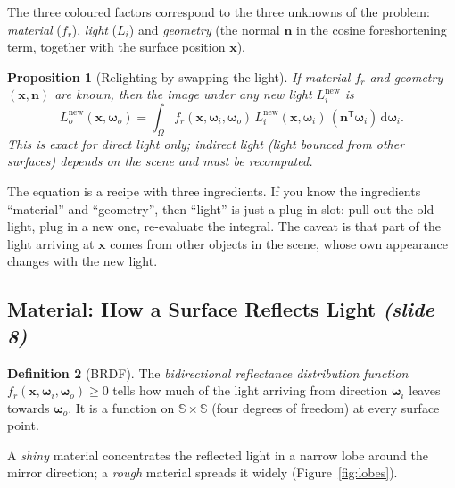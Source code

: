 \documentclass[11pt,a4paper]{article}
\newcommand{\slideone}[1]{\texorpdfstring{\emph{(slide #1)}}{(slide #1)}}
\newcommand{\Sph}{\mathbb{S}}
\newcommand{\x}{{\bm{x}}}
\newcommand{\wi}{{\bm{\omega}_i}}
\newcommand{\wo}{{\bm{\omega}_o}}
\newcommand{\n}{{\bm{n}}}
\newcommand{\fr}{f_r}
\newcommand{\Lo}{L_o}
\newcommand{\Li}{L_i}
\theoremstyle{definition}
\newtheorem{definition}{Definition}[section]
\theoremstyle{plain}
\newtheorem{proposition}[definition]{Proposition}
\theoremstyle{remark}
\begin{document}
The three coloured factors correspond to the three unknowns of the problem: \emph{material} ($\fr$), \emph{light} ($\Li$) and \emph{geometry} (the normal $\n$ in the cosine foreshortening term, together with the surface position $\x$).

\begin{proposition}[Relighting by swapping the light]\label{prop:swap}
If material $\fr$ and geometry $(\x,\n)$ are known, then the image under any new light $\Li^{\mathrm{new}}$ is
\[
 \Lo^{\mathrm{new}}(\x,\wo)=\int_{\Omega}\fr(\x,\wi,\wo)\,\Li^{\mathrm{new}}(\x,\wi)\,(\n^{\mathsf T}\wi)\,\mathrm d\wi .
\]
This is exact for \emph{direct} light only; indirect light (light bounced from other surfaces) depends on the scene and must be recomputed.
\end{proposition}

\begin{intuition}
The equation is a recipe with three ingredients. If you know the ingredients ``material'' and ``geometry'', then ``light'' is just a plug-in slot: pull out the old light, plug in a new one, re-evaluate the integral. The caveat is that part of the light arriving at $\x$ comes from other objects in the scene, whose own appearance changes with the new light.
\end{intuition}

\subsection{Material: How a Surface Reflects Light \slideone{8}}

\begin{definition}[BRDF]
The \emph{bidirectional reflectance distribution function} $\fr(\x,\wi,\wo)\ge 0$ tells how much of the light arriving from direction $\wi$ leaves towards $\wo$. It is a function on $\Sph\times\Sph$ (four degrees of freedom) at every surface point.
\end{definition}

A \emph{shiny} material concentrates the reflected light in a narrow lobe around the mirror direction; a \emph{rough} material spreads it widely (Figure~\ref{fig:lobes}).
\end{document}
